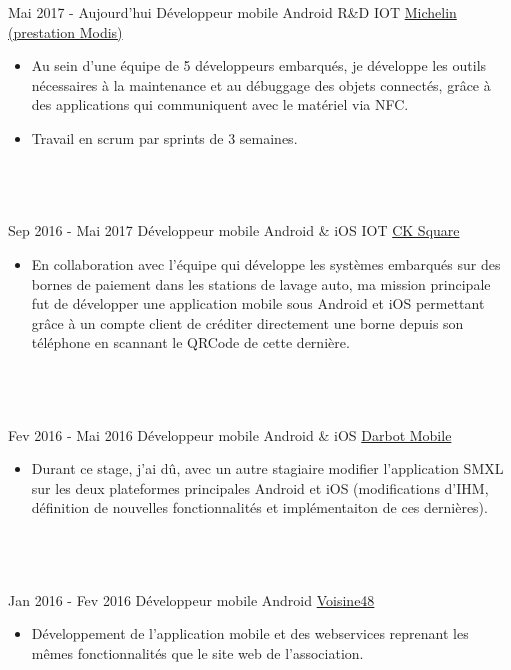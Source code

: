 \documentclass[letterpaper]{twentysecondcv} %
\begin{document}
\begin{twenty} %
\twentyitem
    	{Mai 2017 -}
		{Aujourd'hui}
        {Développeur mobile Android R\&D IOT}
        {\href{http://www.michelin.fr/}{Michelin (prestation Modis)}}
        {}
        {\begin{itemize}
        \item Au sein d'une équipe de 5 développeurs embarqués, je développe les outils nécessaires à la maintenance et au débuggage des objets connectés, grâce à des applications qui communiquent avec le matériel via NFC.
        \item Travail en scrum par sprints de 3 semaines.
        \end{itemize}}
        \\ \\ \\
	\twentyitem
    	{Sep 2016 -}
		{Mai 2017}
        {Développeur mobile Android \& iOS IOT}
        {\href{http://www.cksquare.fr/}{CK Square}}
        {}
        {
        {\begin{itemize}
        \item En collaboration avec l'équipe qui développe les systèmes embarqués sur des bornes de paiement dans les stations de lavage auto, ma mission principale fut de développer une application mobile sous Android et iOS permettant grâce à un compte client de créditer directement une borne depuis son téléphone en scannant le QRCode de cette dernière.
    \end{itemize}}
        }
    \\ \\ \\
    \twentyitem
   		{Fev 2016 -}
		{Mai 2016}
        {Développeur mobile Android \& iOS}
        {\href{https://www.smxlapp.com/}{Darbot Mobile}}
        {}
        {
        {\begin{itemize}
        \item Durant ce stage, j'ai dû, avec un autre stagiaire modifier l'application SMXL sur les deux plateformes principales Android et iOS (modifications d'IHM, définition de nouvelles fonctionnalités et implémentaiton de ces dernières).
    \end{itemize}}
        }
     \\ \\ \\
     \twentyitem
   		{Jan 2016 -}
		{Fev 2016 }
        {Développeur mobile Android}
        {\href{http://www.voisine48.fr/}{Voisine48}}
        {}
        {
        \begin{itemize}
        \item Développement de l'application mobile et des webservices reprenant les mêmes fonctionnalités que le site web de l'association.
    \end{itemize}
    	}
    	
    	\\ \\ \\
    
        
\end{twenty}
\end{document}
